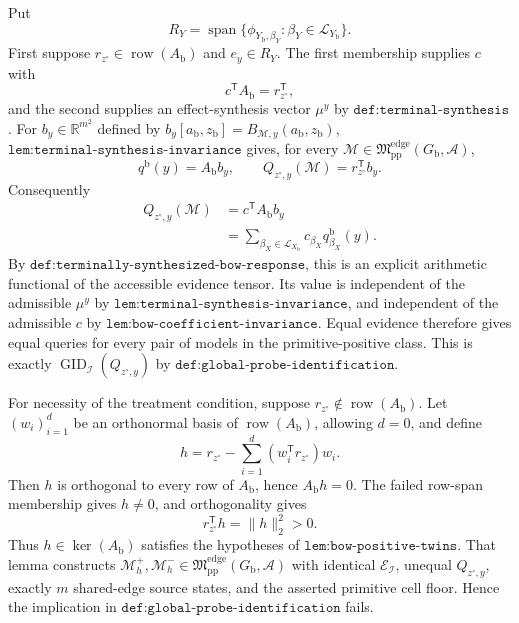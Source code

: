 Put
\[
R_Y=\operatorname{span}\{\phi_{Y_{\mathrm b},\beta_Y}:\beta_Y\in\mathcal L_{Y_{\mathrm b}}\}.
\]
First suppose \(r_{z^{\circ}}\in\operatorname{row}(A_{\mathrm b})\) and \(e_y\in R_Y\).  The first membership supplies \(c\) with
\[
c^{\mathsf T}A_{\mathrm b}=r_{z^{\circ}}^{\mathsf T},
\]
and the second supplies an effect-synthesis vector \(\mu^y\) by \(\texttt{def:terminal-synthesis}\).  For \(b_y\in\mathbb R^{m^2}\) defined by \(b_y[a_{\mathrm b},z_{\mathrm b}]=B_{\mathcal M,y}(a_{\mathrm b},z_{\mathrm b})\), \(\texttt{lem:terminal-synthesis-invariance}\) gives, for every \(\mathcal M\in\mathfrak M_{\mathrm{pp}}^{\mathrm{edge}}(G_{\mathrm b},\mathcal A)\),
\[
q^{\mathrm b}(y)=A_{\mathrm b}b_y,
\qquad
Q_{z^{\circ},y}(\mathcal M)=r_{z^{\circ}}^{\mathsf T}b_y.
\]
Consequently
\[
\begin{aligned}
Q_{z^{\circ},y}(\mathcal M)
&=c^{\mathsf T}A_{\mathrm b}b_y\\
&=\sum_{\beta_X\in\mathcal L_{X_{\mathrm b}}}c_{\beta_X}q^{\mathrm b}_{\beta_X}(y).
\end{aligned}
\]
By \(\texttt{def:terminally-synthesized-bow-response}\), this is an explicit arithmetic functional of the accessible evidence tensor.  Its value is independent of the admissible \(\mu^y\) by \(\texttt{lem:terminal-synthesis-invariance}\), and independent of the admissible \(c\) by \(\texttt{lem:bow-coefficient-invariance}\).  Equal evidence therefore gives equal queries for every pair of models in the primitive-positive class.  This is exactly \(\operatorname{GID}_{\mathcal I}(Q_{z^{\circ},y})\) by \(\texttt{def:global-probe-identification}\).

For necessity of the treatment condition, suppose \(r_{z^{\circ}}\notin\operatorname{row}(A_{\mathrm b})\).  Let \((w_i)_{i=1}^d\) be an orthonormal basis of \(\operatorname{row}(A_{\mathrm b})\), allowing \(d=0\), and define
\[
h=r_{z^{\circ}}-\sum_{i=1}^d(w_i^{\mathsf T}r_{z^{\circ}})w_i.
\]
Then \(h\) is orthogonal to every row of \(A_{\mathrm b}\), hence \(A_{\mathrm b}h=0\).  The failed row-span membership gives \(h\ne0\), and orthogonality gives
\[
r_{z^{\circ}}^{\mathsf T}h=\lVert h\rVert_2^2>0.
\]
Thus \(h\in\ker(A_{\mathrm b})\) satisfies the hypotheses of \(\texttt{lem:bow-positive-twins}\).  That lemma constructs \(\mathcal M_h^+,\mathcal M_h^-\in\mathfrak M_{\mathrm{pp}}^{\mathrm{edge}}(G_{\mathrm b},\mathcal A)\) with identical \(\mathcal E_{\mathcal I}\), unequal \(Q_{z^{\circ},y}\), exactly \(m\) shared-edge source states, and the asserted primitive cell floor.  Hence the implication in \(\texttt{def:global-probe-identification}\) fails.

